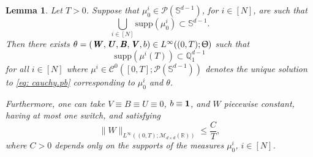 \documentclass[a4paper,11pt]{article}
\theoremstyle{plain}
\newtheorem{lemma}[theorem]{Lemma}
\newcommand{\R}{\mathbb{R}}
\renewcommand{\S}{\mathbb{S}^{d-1}}
\newcommand{\bW}{\bm{\mathit{W}}}
\newcommand{\bV}{\bm{\mathit{V}}}
\newcommand{\bB}{\bm{\mathit{B}}}
\newcommand{\bU}{\bm{\mathit{U}}}
\renewcommand{\leq}{\leqslant}
\numberwithin{equation}{section}
\begin{document}
\begin{lemma} \label{lem: first.quadrant}
Let $T>0$. Suppose that $\mu_0^i\in\mathscr{P}(\S)$, for $i\in[N]$, are such that 
\begin{equation*}
    \bigcup_{i\in[N]} \mathrm{supp}(\mu^i_0)\subset\S.
\end{equation*}
Then there exists $\theta=(\bW,\bU,\bB,\bV,b)\in L^\infty((0,T);\Uptheta)$ such that 
\begin{equation*}
\mathrm{supp}(\mu^i(T)) \subset \mathbb{Q}_1^{d-1}
\end{equation*}
for all $i\in[N]$ where $\mu^i\in \mathscr{C}^0([0,T];\mathscr{P}(\S))$ denotes the unique solution to \eqref{eq: cauchy.pb} corresponding to $\mu_0^i$ and $\theta$.

Furthermore, one can take $\bV\equiv\bB\equiv\bU\equiv0$, $b\equiv{\bf 1}$, and $\bW$ piecewise constant, having at most one switch, and satisfying
\begin{equation*}
\|\bW\|_{L^\infty((0,T);\mathscr{M}_{d\times d}(\R))}\leq \frac{C}{T},
\end{equation*}
where $C>0$ depends only on the supports of the measures $\mu_0^i$, $i\in[N]$.
\end{lemma}
\end{document}
